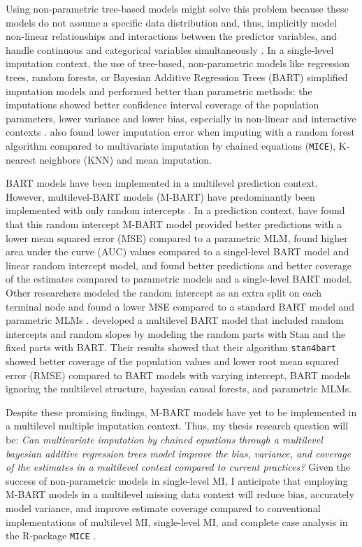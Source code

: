 \documentclass[10pt, a4paper, titlepage]{article}
\begin{document}
Using non-parametric tree-based models might solve this problem because these models do not assume a specific data distribution and, thus, implicitly model non-linear relationships and interactions between the predictor variables, and handle continuous and categorical variables simultaneously \citep{hill2020, burgette2010, lin2019, chipman2010, james2021, salditt2023, breiman1984}. In a single-level imputation context, the use of tree-based, non-parametric models like regression trees, random forests, or Bayesian Additive Regression Trees (BART) simplified imputation models and performed better than parametric methods: the imputations showed better confidence interval coverage of the population parameters, lower variance and lower bias, especially in non-linear and interactive contexts \citep{burgette2010, xu2016, silva2022}. \citet{waljee2013} also found lower imputation error when imputing with a random forest algorithm compared to multivariate imputation by chained equations (\texttt{MICE}), K-nearest neighbors (KNN) and mean imputation.

BART models have been implemented in a multilevel prediction context. However, multilevel-BART models (M-BART) have predominantly been implemented with only random intercepts \citep{chen2020, wagner2020, tan2016, wundervald2022}. In a prediction context, \citet{wagner2020} have found that this random intercept M-BART model provided better predictions with a lower mean squared error (MSE) compared to a parametric MLM, \citet{tan2016} found higher area under the curve (AUC) values compared to a singel-level BART model and linear random intercept model, and \citet{chen2020} found better predictions and better coverage of the estimates compared to parametric models and a single-level BART model. Other researchers modeled the random intercept as an extra split on each terminal node and found a lower MSE compared to a standard BART model and parametric MLMs \citep{wundervald2022}. \citet{dorie2022} developed a multilevel BART model that included random intercepts and random slopes by modeling the random parts with Stan \citep{lee2017} and the fixed parts with BART. Their results showed that their algorithm \texttt{stan4bart} showed better coverage of the population values and lower root mean squared error (RMSE) compared to BART models with varying intercept, BART models ignoring the multilevel structure, bayesian causal forests, and parametric MLMs.

Despite these promising findings, M-BART models have yet to be implemented in a multilevel multiple imputation context. Thus, my thesis research question will be: \textit{Can multivariate imputation by chained equations through a multilevel bayesian additive regression trees model improve the bias, variance, and coverage of the estimates in a multilevel context compared to current practices?} Given the success of non-parametric models in single-level MI, I anticipate that employing M-BART models in a multilevel missing data context will reduce bias, accurately model variance, and improve estimate coverage compared to conventional implementations of multilevel MI, single-level MI, and complete case analysis in the R-package \texttt{MICE} \citep{buuren2011}.
\end{document}
